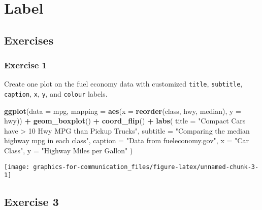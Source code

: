 \documentclass[]{book}
\newenvironment{Shaded}{\begin{snugshade}}{\end{snugshade}}
\newcommand{\DataTypeTok}[1]{\textcolor[rgb]{0.13,0.29,0.53}{#1}}
\newcommand{\KeywordTok}[1]{\textcolor[rgb]{0.13,0.29,0.53}{\textbf{#1}}}
\newcommand{\NormalTok}[1]{#1}
\newcommand{\OperatorTok}[1]{\textcolor[rgb]{0.81,0.36,0.00}{\textbf{#1}}}
\newcommand{\StringTok}[1]{\textcolor[rgb]{0.31,0.60,0.02}{#1}}
\theoremstyle{plain}
\theoremstyle{remark}
\theoremstyle{definition}
\theoremstyle{definition}
\theoremstyle{definition}
\theoremstyle{remark}
\begin{document}
\hypertarget{label}{%
\section{Label}\label{label}}

\hypertarget{exercises-7}{%
\subsection{Exercises}\label{exercises-7}}

\hypertarget{exercise-1-73}{%
\subsubsection{Exercise 1}\label{exercise-1-73}}

Create one plot on the fuel economy data with customized \texttt{title},
\texttt{subtitle}, \texttt{caption}, \texttt{x}, \texttt{y}, and
\texttt{colour} labels.

\begin{Shaded}
\begin{Highlighting}[]
\KeywordTok{ggplot}\NormalTok{(}\DataTypeTok{data =}\NormalTok{ mpg,}
       \DataTypeTok{mapping =} \KeywordTok{aes}\NormalTok{(}\DataTypeTok{x =} \KeywordTok{reorder}\NormalTok{(class, hwy, median), }\DataTypeTok{y =}\NormalTok{ hwy)) }\OperatorTok{+}
\StringTok{  }\KeywordTok{geom_boxplot}\NormalTok{() }\OperatorTok{+}
\StringTok{  }\KeywordTok{coord_flip}\NormalTok{() }\OperatorTok{+}
\StringTok{  }\KeywordTok{labs}\NormalTok{(}
    \DataTypeTok{title =} \StringTok{"Compact Cars have > 10 Hwy MPG than Pickup Trucks"}\NormalTok{,}
    \DataTypeTok{subtitle =} \StringTok{"Comparing the median highway mpg in each class"}\NormalTok{,}
    \DataTypeTok{caption =} \StringTok{"Data from fueleconomy.gov"}\NormalTok{,}
    \DataTypeTok{x =} \StringTok{"Car Class"}\NormalTok{,}
    \DataTypeTok{y =} \StringTok{"Highway Miles per Gallon"}
\NormalTok{  )}
\end{Highlighting}
\end{Shaded}

\begin{center}\texttt{[image: graphics-for-communication\_files/figure-latex/unnamed-chunk-3-1]} \end{center}

\hypertarget{exercise-3-57}{%
\subsection{Exercise 3}\label{exercise-3-57}}
\end{document}
